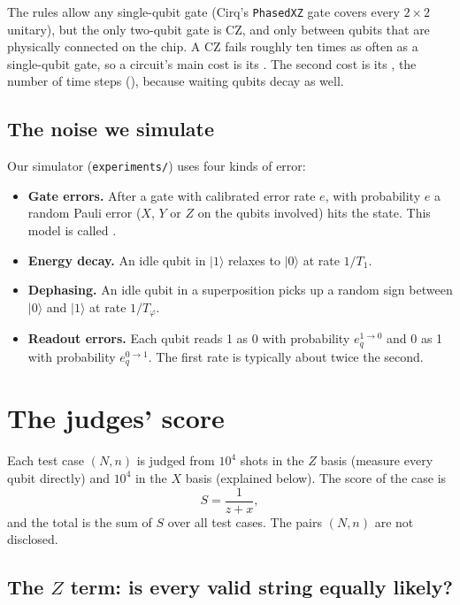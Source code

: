 \documentclass[11pt]{scrartcl}
\newcommand{\ket}[1]{\lvert #1\rangle}
\newcommand{\CZ}{\ensuremath{\mathrm{CZ}}}
\newcommand{\file}[1]{\texttt{\small #1}}
\begin{document}
The rules allow any single-qubit gate (Cirq's \texttt{PhasedXZ} gate covers every $2\times2$
unitary), but the only two-qubit gate is \CZ{}, and only between qubits that are physically
connected on the chip. A \CZ{} fails roughly ten times as often as a single-qubit gate, so a
circuit's main cost is its . The second cost is its , the number of
time steps (), because waiting qubits decay as well.

\subsection{The noise we simulate}

Our simulator (\file{experiments/}) uses four kinds of error:
\begin{itemize}
  \item \textbf{Gate errors.} After a gate with calibrated error rate $e$, with probability $e$ a
        random Pauli error ($X$, $Y$ or $Z$ on the qubits involved) hits the state. This model is
        called .
  \item \textbf{Energy decay.} An idle qubit in $\ket1$ relaxes to $\ket0$ at rate $1/T_1$.
  \item \textbf{Dephasing.} An idle qubit in a superposition picks up a random sign between $\ket0$
        and $\ket1$ at rate $1/T_\varphi$.
  \item \textbf{Readout errors.} Each qubit reads 1 as 0 with probability $e^{1\to0}_q$ and 0 as
        1 with probability $e^{0\to1}_q$. The first rate is typically about twice the second.
\end{itemize}

\section{The judges' score}

Each test case $(N,n)$ is judged from $10^4$ shots in the $Z$ basis (measure every qubit
directly) and $10^4$ in the $X$ basis (explained below). The score of the case is
\[
  S=\frac{1}{z+x},
\]
and the total is the sum of $S$ over all test cases. The pairs $(N,n)$ are not disclosed.

\subsection{The \texorpdfstring{$Z$}{Z} term: is every valid string equally likely?}
\end{document}
